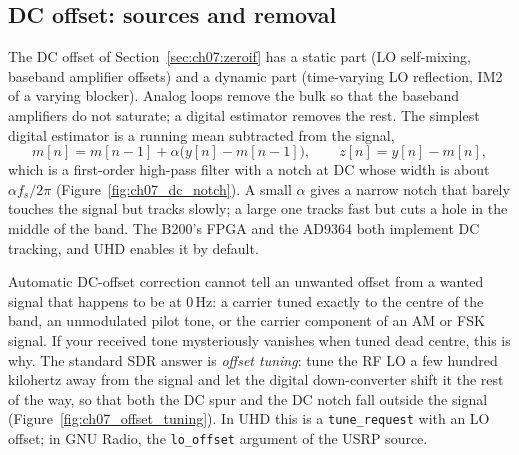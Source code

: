 
\subsection{DC offset: sources and removal}

The DC offset of Section~\ref{sec:ch07:zeroif} has a static part (LO self-mixing, baseband amplifier
offsets) and a dynamic part (time-varying LO reflection, IM2 of a varying blocker). Analog loops remove
the bulk so that the baseband amplifiers do not saturate; a digital estimator removes the rest. The
simplest digital estimator is a running mean subtracted from the signal,
\begin{equation}
m[n]=m[n-1]+\alpha\big(y[n]-m[n-1]\big),\qquad z[n]=y[n]-m[n],
\end{equation}
which is a first-order high-pass filter with a notch at DC whose width is about $\alpha f_s/2\pi$
(Figure~\ref{fig:ch07_dc_notch}). A small $\alpha$ gives a narrow notch that barely touches the signal
but tracks slowly; a large one tracks fast but cuts a hole in the middle of the band. The B200's FPGA
and the AD9364 both implement DC tracking, and UHD enables it by default.

\begin{pitfall}
Automatic DC-offset correction cannot tell an unwanted offset from a wanted signal that happens to be at
0\,Hz: a carrier tuned exactly to the centre of the band, an unmodulated pilot tone, or the carrier
component of an AM or FSK signal. If your received tone mysteriously vanishes when tuned dead centre,
this is why. The standard SDR answer is \emph{offset tuning}: tune the RF LO a few hundred kilohertz away
from the signal and let the digital down-converter shift it the rest of the way, so that both the DC
spur and the DC notch fall outside the signal (Figure~\ref{fig:ch07_offset_tuning}). In UHD this is a \texttt{tune\_request} with an LO offset;
in GNU Radio, the \texttt{lo\_offset} argument of the USRP source.
\end{pitfall}


